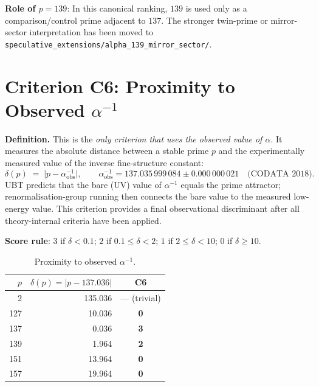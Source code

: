 \documentclass[12pt,a4paper]{article}
\theoremstyle{definition}
\theoremstyle{remark}
\begin{document}
\begin{infobox}
\textbf{Role of $p=139$}: In this canonical ranking, $139$ is used only as a
comparison/control prime adjacent to $137$.  The stronger twin-prime or
mirror-sector interpretation has been moved to
\texttt{speculative\_extensions/alpha\_139\_mirror\_sector/}.
\end{infobox}

\section{Criterion C6: Proximity to Observed $\alpha^{-1}$}
\label{sec:spr:c6}

\textbf{Definition.}
This is the \emph{only criterion that uses the observed value of $\alpha$}.
It measures the absolute distance between a stable prime $p$ and
the experimentally measured value of the inverse fine-structure constant:
\[
  \delta(p) \;=\; \bigl|p - \alpha^{-1}_{\mathrm{obs}}\bigr|,
  \qquad
  \alpha^{-1}_{\mathrm{obs}} = 137.035\,999\,084 \pm 0.000\,000\,021
  \quad\text{(CODATA~2018)}.
\]
UBT predicts that the bare (UV) value of $\alpha^{-1}$ equals the prime
attractor; renormalisation-group running then connects the bare value to the
measured low-energy value.  This criterion provides a final observational
discriminant after all theory-internal criteria have been applied.

\textbf{Score rule}:
$3$ if $\delta < 0.1$;\;
$2$ if $0.1 \leq \delta < 2$;\;
$1$ if $2 \leq \delta < 10$;\;
$0$ if $\delta \geq 10$.

\begin{table}[h]
\centering
\caption{Proximity to observed $\alpha^{-1}$.}
\label{tab:spr:c6}
\begin{tabular}{rrc}
\toprule
$p$ & $\delta(p) = |p - 137.036|$ & \textbf{C6} \\
\midrule
  2 & 135.036 & — (trivial) \\
127 & 10.036  & \textbf{0} \\
137 &  0.036  & \textbf{3} \\
139 &  1.964  & \textbf{2} \\
151 & 13.964  & \textbf{0} \\
157 & 19.964  & \textbf{0} \\
\bottomrule
\end{tabular}
\end{table}
\end{document}
